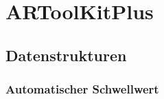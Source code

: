\section{ARToolKitPlus} %
\label{sec:artoolkitplus}

% 

\subsection{Datenstrukturen} %
\label{sec:datenstrukturen}


\subsubsection{Automatischer Schwellwert} %
\label{sec:automatischer_schwellwert}

